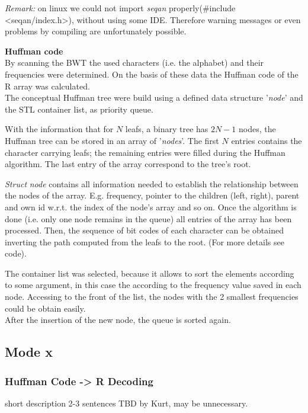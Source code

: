 \documentclass[11pt, notitlepage]{scrartcl}
\begin{document}
\emph{Remark:} on linux we could not import \textit{seqan} properly(\#include <seqan/index.h>), without using some IDE. Therefore warning messages or even problems by compiling are unfortunately possible.


\textbf{Huffman code}\\
By scanning the BWT the used characters (i.e. the alphabet) and their frequencies were determined. On the basis of these data the Huffman code of the R array was calculated.\\
The conceptual Huffman tree were build using a defined data structure '\textit{node}' and the STL container list, as priority queue.

With the information that for $N$ leafs, a binary tree has $2N-1$ nodes, the Huffman tree can be stored in an array of '\textit{nodes}'. The first $N$ entries contains the character carrying leafs; the remaining entries were filled during the Huffman algorithm. The last entry of the array correspond to the tree's root.

\textit{Struct} \textit{node} contains all information needed to establish the relationship between the nodes of the array. E.g. frequency, pointer to the children (left, right), parent and own id w.r.t. the index of the node's array and so on. Once the algorithm is done (i.e. only one node remains in the queue) all entries of the array has been processed. Then, the sequence of bit codes of each character can be obtained inverting the path computed from the leafs to the root. (For more details see code).

The container list was selected, because it allows to sort the elements according to some argument, in this case the according to the frequency value saved in each node. Accessing to the front of the list, the nodes with the 2 smallest frequencies could be obtain easily. \\
After the insertion of the new node, the queue is sorted again.

\subsection{Mode x}
\subsubsection{Huffman Code -> R Decoding}
short description 2-3 sentences TBD by Kurt, may be unnecessary.
\end{document}
